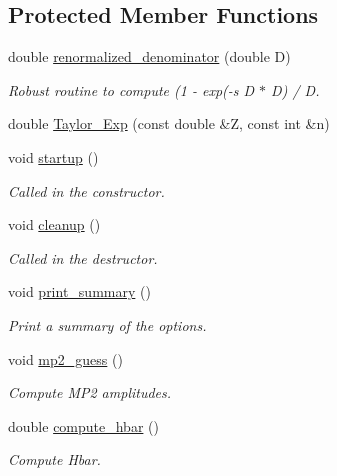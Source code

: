 \subsection*{Protected Member Functions}
\begin{DoxyCompactItemize}
\item 
double \mbox{\hyperlink{classforte_1_1_s_o_m_r_d_s_r_g_af9b3267baac5a59113f556a8474597a6}{renormalized\+\_\+denominator}} (double D)
\begin{DoxyCompactList}\small\item\em Robust routine to compute (1 -\/ exp(-\/s D $\ast$ D) / D. \end{DoxyCompactList}\item 
double \mbox{\hyperlink{classforte_1_1_s_o_m_r_d_s_r_g_a71e71effcdf8598118080c8b8692dcb9}{Taylor\+\_\+\+Exp}} (const double \&Z, const int \&n)
\item 
void \mbox{\hyperlink{classforte_1_1_s_o_m_r_d_s_r_g_a5c988f472bf263321c43696c10b67b91}{startup}} ()
\begin{DoxyCompactList}\small\item\em Called in the constructor. \end{DoxyCompactList}\item 
void \mbox{\hyperlink{classforte_1_1_s_o_m_r_d_s_r_g_a436d33651a3da48db4f49df1d5bc0be3}{cleanup}} ()
\begin{DoxyCompactList}\small\item\em Called in the destructor. \end{DoxyCompactList}\item 
void \mbox{\hyperlink{classforte_1_1_s_o_m_r_d_s_r_g_a0384198e1aacead895e68298c62ea5d5}{print\+\_\+summary}} ()
\begin{DoxyCompactList}\small\item\em Print a summary of the options. \end{DoxyCompactList}\item 
void \mbox{\hyperlink{classforte_1_1_s_o_m_r_d_s_r_g_a38d6210fa32a8e9a25d09336fc36aef6}{mp2\+\_\+guess}} ()
\begin{DoxyCompactList}\small\item\em Compute M\+P2 amplitudes. \end{DoxyCompactList}\item 
double \mbox{\hyperlink{classforte_1_1_s_o_m_r_d_s_r_g_a991de8522e933316133cbeb5db5cbb04}{compute\+\_\+hbar}} ()
\begin{DoxyCompactList}\small\item\em Compute Hbar. \end{DoxyCompactList}\item 

\end{DoxyCompactItemize}
